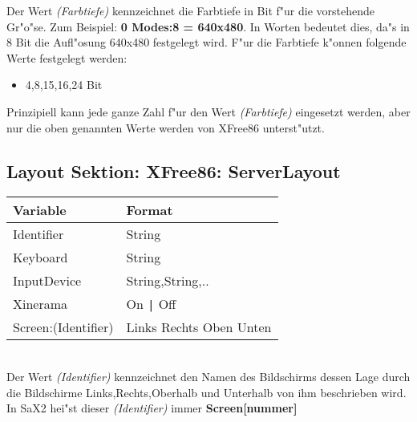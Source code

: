 Der Wert \textit{(Farbtiefe)} kennzeichnet die Farbtiefe in Bit f"ur die
vorstehende Gr"o"se. Zum Beispiel: \textbf{0 Modes:8 = 640x480}. In 
Worten bedeutet dies, da"s in 8 Bit die Aufl"osung 640x480 festgelegt
wird. F"ur die Farbtiefe k"onnen folgende Werte festgelegt werden:
\begin{itemize}
\item 4,8,15,16,24 Bit
\end{itemize}
Prinzipiell kann jede ganze Zahl f"ur den Wert \textit{(Farbtiefe)}
eingesetzt werden, aber nur die oben genannten Werte werden von XFree86
unterst"utzt.

\subsection{Layout Sektion: XFree86: ServerLayout}
\begin{tabular}[h]{|p{5cm}|p{7cm}|}
 \hline
 \textbf{Variable}     & \textbf{Format}        \\
 \hline
 Identifier                 & String                   \\
 Keyboard                   & String                   \\
 InputDevice                & String,String,..         \\
 Xinerama                   & On \verb+|+ Off          \\
 Screen:(Identifier)        & Links Rechts Oben Unten  \\
 \hline
\end{tabular}\\

Der Wert \textit{(Identifier)} kennzeichnet den Namen des 
Bildschirms dessen Lage durch die Bildschirme Links,Rechts,Oberhalb
und Unterhalb von ihm beschrieben wird. In SaX2 hei"st dieser
\textit{(Identifier)} immer \textbf{Screen[nummer]}

